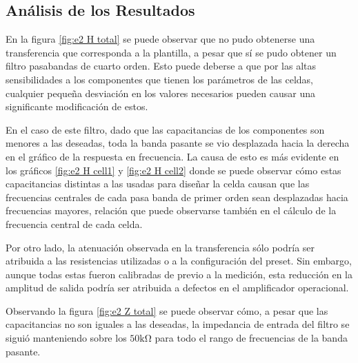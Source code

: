 %

\subsection{Análisis de los Resultados}

En la figura \ref{fig:e2 H total} se puede observar que no pudo obtenerse una transferencia que corresponda a la plantilla, a pesar que sí se pudo obtener un filtro pasabandas de cuarto orden. Esto puede deberse a que por las altas sensibilidades a los componentes que tienen los parámetros de las celdas, cualquier pequeña desviación en los valores necesarios pueden causar una significante modificación de estos.

En el caso de este filtro, dado que las capacitancias de los componentes son menores a las deseadas, toda la banda pasante se vio desplazada hacia la derecha en el gráfico de la respuesta en frecuencia. La causa de esto es más evidente en los gráficos \ref{fig:e2 H cell1} y \ref{fig:e2 H cell2} donde se puede observar cómo estas capacitancias distintas a las usadas para diseñar la celda causan que las frecuencias centrales de cada pasa banda de primer orden sean desplazadas hacia frecuencias mayores, relación que puede observarse también en el cálculo de la frecuencia central de cada celda.

Por otro lado, la atenuación observada en la transferencia sólo podría ser atribuida a las resistencias utilizadas o a la configuración del preset. Sin embargo, aunque todas estas fueron calibradas de previo a la medición, esta reducción en la amplitud de salida podría ser atribuida a defectos en el amplificador operacional.

Observando la figura \ref{fig:e2 Z total} se puede observar cómo, a pesar que las capacitancias no son iguales a las deseadas, la impedancia de entrada del filtro se siguió manteniendo sobre los $50 \si{\kilo\ohm}$ para todo el rango de frecuencias de la banda pasante.

